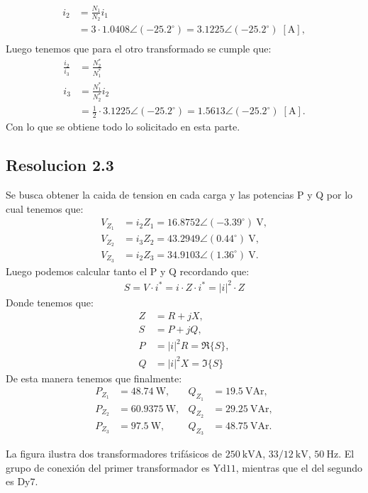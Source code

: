 \documentclass[
  11pt,
  letterpaper,
   addpoints,
  ]{exam}
\begin{document}
\begin{questions}
\begin{solution}
\begin{align}
    i_2 &= \frac{N_1}{N_2} i_1\\
    &= 3 \cdot 1.0408\angle(-25.2^\circ) = 3.1225\angle(-25.2^\circ)\;[\mathrm{A}], \\
\end{align}
Luego tenemos que para el otro transformado se cumple que:
\begin{align}
    \frac{i_2}{i_3} &= \frac{N_2^*}{N_1^*} \\
    i_3 &= \frac{N_1^*}{N_2^*} i_2\\
    &= \frac{1}{2} \cdot 3.1225\angle(-25.2^\circ) = 1.5613\angle(-25.2^\circ)\;[\mathrm{A}].
\end{align}
Con lo que se obtiene todo lo solicitado en esta parte.
\subsection*{Resolucion 2.3}
Se busca obtener la caida de tension en cada carga y las potencias P y Q por lo cual tenemos que:
\begin{align}
    V_{Z_1}&=i_2 Z_1=16.8752\angle(-3.39^\circ)\ \mathrm{V},\\
    V_{Z_2}&=i_3 Z_2=43.2949\angle(0.44^\circ)\ \mathrm{V},\\
    V_{Z_3}&=i_2 Z_3=34.9103\angle(1.36^\circ)\ \mathrm{V}.
\end{align}
Luego podemos calcular tanto el P y Q recordando que:
\begin{align}
    S = V \cdot i^{*} = i \cdot Z \cdot i^{*} = |i|^2 \cdot Z
\end{align}
Donde tenemos que:
\begin{align}
  Z &= R + jX, \\
  S &= P + jQ, \\
  P &= |i|^2 R = \Re\{S\}, \\
  Q &= |i|^2 X = \Im\{S\}
\end{align}
De esta manera tenemos que finalmente:
\begin{align}
    P_{Z_1}&=48.74~\mathrm{W}, &Q_{Z_1}&=19.5~\mathrm{VAr},\\
    P_{Z_2}&=60.9375~\mathrm{W}, &Q_{Z_2}&=29.25~\mathrm{VAr},\\
    P_{Z_3}&=97.5~\mathrm{W}, &Q_{Z_3}&=48.75~\mathrm{VAr}.
\end{align}
\end{solution}
\newpage
\question La figura ilustra dos transformadores trifásicos de \(250~\text{kVA}\), \(33/12~\text{kV}\), \(50~\text{Hz}\).
El grupo de conexión del primer transformador es \(\mathrm{Yd11}\), mientras que el del segundo es \(\mathrm{Dy7}\).


\end{questions}
\end{document}
